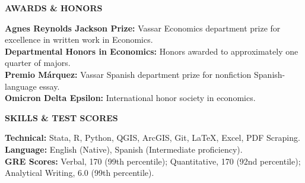 \documentclass[11pt]{article}
\begin{document}
\begin{center}
    \textbf{AWARDS \& HONORS}
\end{center}

\textbf{Agnes Reynolds Jackson Prize:} Vassar Economics department prize for excellence in written work in Economics. \\
\textbf{Departmental Honors in Economics:} Honors awarded to approximately one quarter of majors. \\
\textbf{Premio Márquez:} Vassar Spanish department prize for nonfiction Spanish-language essay.\\
\textbf{Omicron Delta Epsilon:} International honor society in economics.

\begin{center}
    \textbf{SKILLS \& TEST SCORES}
\end{center}

\textbf{Technical:} Stata, R, Python, QGIS, ArcGIS, Git, \LaTeX, Excel, PDF Scraping.\\
\textbf{Language:} English (Native), Spanish (Intermediate proficiency).\\
\textbf{GRE Scores:} Verbal, 170 (99th percentile); Quantitative, 170 (92nd percentile); Analytical Writing, 6.0 (99th percentile).
\end{document}
